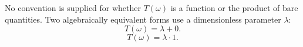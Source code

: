 \documentclass{article}
\begin{document}
No convention is supplied for whether $T(\omega)$ is a function or the
product of bare quantities.  Two algebraically equivalent forms use a
dimensionless parameter $\lambda$:
\begin{equation}
T(\omega)=\lambda+0 .\label{lambda-one}
\end{equation}
\begin{equation}
T(\omega)=\lambda\cdot1 .\label{lambda-two}
\end{equation}
\end{document}
